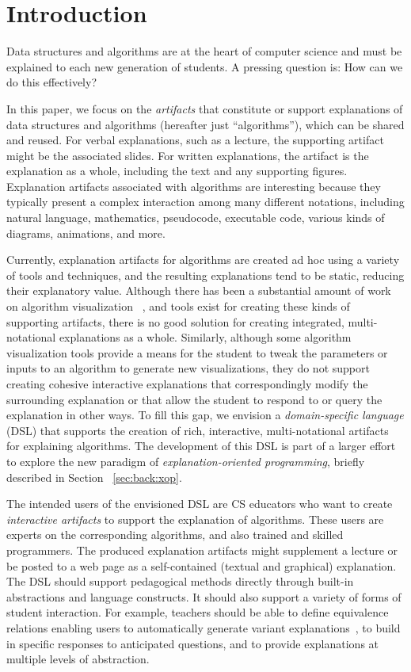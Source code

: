\documentclass[sigconf]{acmart}
\begin{document}
\section{Introduction}
\label{sec:intro}

Data structures and algorithms are at the heart of computer science and must be
explained to each new generation of students. A pressing question is: How can we
do this effectively?

In this paper, we focus on the \emph{artifacts} that constitute or support
explanations of data structures and algorithms (hereafter just ``algorithms''),
which can be shared and reused.
%
For verbal explanations, such as a lecture, the supporting artifact might be
the associated slides. For written explanations, the artifact is the
explanation as a whole, including the text and any supporting figures.
%
Explanation artifacts associated with algorithms are interesting because they
typically present a complex interaction among many different notations,
including natural language, mathematics, pseudocode, executable code, various
kinds of diagrams, animations, and more.


Currently, explanation artifacts for algorithms are created ad hoc using a
variety of tools and techniques, and the resulting explanations tend to be
static, reducing their explanatory value.
%
Although there has been a substantial amount of work on algorithm visualization~
\cite{Gloor92,Gloor97,HDS02, shaffer2010algorithm, HANSEN2002291, KANN1997223},
and tools exist for creating these kinds of supporting artifacts, there is no
good solution for creating integrated, multi-notational explanations as a whole.
Similarly, although some algorithm visualization tools provide a means for the
student to tweak the parameters or inputs to an algorithm to generate new
visualizations, they do not support creating cohesive interactive explanations
that correspondingly modify the surrounding explanation or that allow the
student to respond to or query the explanation in other ways.
%
To fill this gap, we envision a \emph{domain-specific language} (DSL) that
supports the creation of rich, interactive, multi-notational artifacts for
explaining algorithms.
%
The development of this DSL is part of a larger effort to explore the new
paradigm of \emph{explanation-oriented programming}, briefly described in
Section~ \ref{sec:back:xop}.


The intended users of the envisioned DSL are CS educators who want to create
\emph{interactive artifacts} to support the explanation of algorithms. These
users are experts on the corresponding algorithms, and also trained and skilled
programmers. The produced explanation artifacts might supplement a lecture or
be posted to a web page as a self-contained (textual and graphical)
explanation.
%
The DSL should support pedagogical methods directly through built-in
abstractions and language constructs. It should also support a variety of forms
of student interaction. For example, teachers should be able to define
equivalence relations enabling users to automatically generate variant
explanations~\cite{EW13jvlc}, to build in specific responses to anticipated
questions, and to provide explanations at multiple levels of abstraction.
\end{document}
